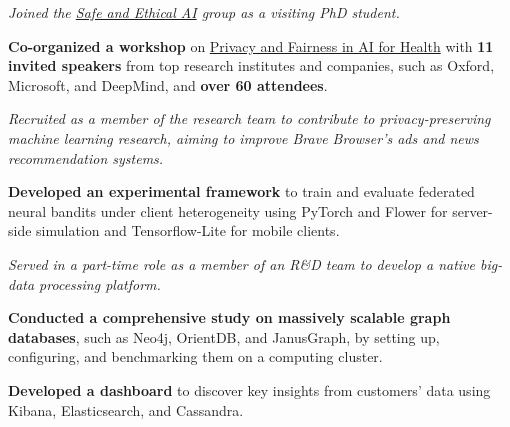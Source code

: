 \documentclass[11pt]{article}
\begin{document}
\begin{outerlist}
{\textit{Joined the \href{https://www.turing.ac.uk/research/research-programmes/artificial-intelligence-ai/safe-and-ethical}{Safe and Ethical AI} group as a visiting PhD student.}
  \begin{innerlist}
    \item \textbf{Co-organized a workshop} on \href{https://private-fair-ai.github.io/}{Privacy and Fairness in AI for Health} with \textbf{11 invited speakers} from top research institutes and companies, such as {Oxford}, {Microsoft}, and {DeepMind}, and \textbf{over 60 attendees}.
  \end{innerlist}}

{
\textit{Recruited as a member of the research team to contribute to privacy-preserving machine learning research, aiming to improve Brave Browser's ads and news recommendation systems.}
  \begin{innerlist}
    \item \textbf{Developed an experimental framework} to train and evaluate federated neural bandits under client heterogeneity using {PyTorch} and {Flower} for server-side simulation and {Tensorflow-Lite} for mobile clients.
  \end{innerlist}}

{\textit{Served in a part-time role as a member of an R\&D team to develop a native big-data processing platform.}
  \begin{innerlist}
    \item \textbf{Conducted a comprehensive study on massively scalable graph databases}, such as {Neo4j}, OrientDB, and JanusGraph, by setting up, configuring, and benchmarking them on a computing cluster.
    \item \textbf{Developed a dashboard} to discover key insights from customers' data using {Kibana}, {Elasticsearch}, and {Cassandra}.
  \end{innerlist}}


\end{outerlist}
\end{document}
